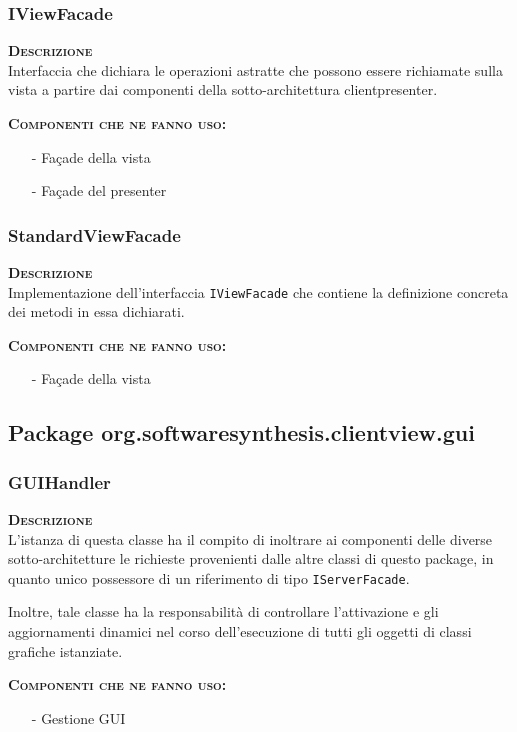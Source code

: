 \subsubsection{IViewFacade}
\begin{description}
  \item{\scshape\bfseries Descrizione}\\
Interfaccia che dichiara le operazioni astratte che possono essere richiamate sulla vista a partire dai componenti della sotto-architettura clientpresenter.
  \item{\scshape\bfseries Componenti che ne fanno uso:}
  \begin{itemize}[noitemsep,nolistsep]
    \item[-] Façade della vista
    \item[-] Façade del presenter
  \end{itemize}
\end{description}

\subsubsection{StandardViewFacade}
\begin{description}
  \item{\scshape\bfseries Descrizione}\\
Implementazione dell'interfaccia \texttt{IViewFacade} che contiene la definizione concreta dei metodi in essa dichiarati.
  \item{\scshape\bfseries Componenti che ne fanno uso:}
  \begin{itemize}[noitemsep,nolistsep]
    \item[-] Façade della vista
  \end{itemize}
\end{description}

\subsection{Package org.softwaresynthesis.clientview.gui}
\subsubsection{GUIHandler}
\begin{description}
  \item{\scshape\bfseries Descrizione}\\
L'istanza di questa classe ha il compito di inoltrare ai componenti delle diverse sotto-architetture le richieste provenienti dalle altre classi di questo package, in quanto unico possessore di un riferimento di tipo \texttt{IServerFacade}.

Inoltre, tale classe ha la responsabilità di controllare l'attivazione e gli aggiornamenti dinamici nel corso dell'esecuzione di tutti gli oggetti di classi grafiche istanziate.
  \item{\scshape\bfseries Componenti che ne fanno uso:}
  \begin{itemize}[noitemsep,nolistsep]
    \item[-] Gestione GUI
  \end{itemize}
\end{description}

